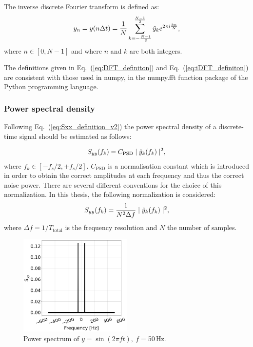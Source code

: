 The inverse discrete Fourier transform is defined as:
\begin{equation}\label{eq:iDFT_definiton}
 y_n =  y(n\Delta t) = \frac{1}{N} \sum_{k=-\frac{N-1}{2}}^{\frac{N-1}{2}} \hat{y}_k e^{2\pi {i} \frac{k n}{N}},
\end{equation}
where $n \in \left[0,N-1 \right ]$ and where $n$ and $k$ are both integers.

The definitions given in Eq.~(\ref{eq:DFT_definiton}) and Eq.~(\ref{eq:iDFT_definiton}) are consistent with those used in numpy, in the numpy.fft function \cite{numpy_fft} package of the Python programming language. 

\subsubsection*{Power spectral density} %
Following Eq.~(\ref{eq:Sxx_definition_v2}) the power spectral density of a discrete-time signal should be estimated as follows:

\begin{equation}\label{eq:Sxx_definition_discrete_not_normalised}
    S_{yy}(f_k) = C_\mathrm{PSD} \mid \hat{y}_k(f_k) \mid ^2,
\end{equation}
where $f_k \in \left[-f_s/2, + f_s/2 \right]$. $C_\mathrm{PSD}$ is a normalisation constant which is introduced in order to obtain the correct amplitudes at each frequency and thus the correct noise power. There are several different conventions for the choice of this normalization. In this thesis, the following normalization is considered:%
\begin{equation}\label{eq:Sxx_definition_discrete_normalized}
    S_{yy}(f_k) = \frac{1}{N^2 \Delta f} \mid \hat{y}_k(f_k) \mid ^2,
\end{equation}
where  $\Delta f = 1/T_\mathrm{total}$ is the frequency resolution and $N$ the number of samples.
    
\begin{figure}[!ht]
    \centering         
    \includegraphics[width=0.5\textwidth]{./images/app_B/simple_signal_1freq_psd_example.png}
        \caption{Power spectrum of $y=\sin(2 \pi f t),\ f = $50\,Hz.}
        \label{fig:psd_example_two_sided}
\end{figure}

